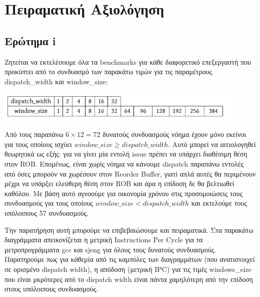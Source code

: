 \section{Πειραματική Αξιολόγηση}
\subsection{Ερώτημα i}
Ζητείται να εκτελέσουμε όλα τα benchmarks για κάθε διαφορετικό επεξεργαστή που
προκύπτει από το συνδυασμό των παρακάτω τιμών για τις παραμέτρους dispatch\_width
και window\_size:

\begin{center}
   \vspace{3mm}
   \includegraphics[width=0.9\textwidth]{./imgs/combos.png}
   \vspace{3mm}
\end{center}

\noindent Από τους παραπάνω $6 \times 12  = 72$ δυνατούς συνδυασμούς νόημα έχουν
μόνο εκείνοι για τους οποίους ισχύει $window\_size \geq dispatch\_width$. Αυτό
μπορεί να αιτιολογηθεί θεωρητικά ως εξής: για να γίνει μία εντολή issue πρέπει
να υπάρχει διαθέσιμη θέση στον ROB. Επομένως, είναι χωρίς νόημα να κάνουμε
dispatch παραπάνω εντολές από όσες μπορούν να χωρέσουν στον Reorder Buffer,
γιατί απλά αυτές θα περιμένουν μέχρι να υπάρξει ελεύθερη θέση στον ROB και άρα η
επίδοση δε θα βελτιωθεί καθόλου. Με βάση αυτό αγνοούμε για οικονομία χρόνου στις
προσομοιώσεις τους συνδυασμούς για τους οποίους $window\_size < dispatch\_width$
και εκτελούμε τους υπόλοιπους 57 συνδυασμούς. 

Την παρατήρηση αυτή μπορούμε να επιβεβαιώσουμε και πειραματικά. Στα παρακάτω
διαγράμματα απεικονίζεται η μετρική Instructions Per Cycle για τα
μετροπρογράμματα gcc και sjeng για όλους τους δυνατούς συνδυασμούς. Παρατηρούμε
πως για κάθεμία από τις καμπύλες των διαγραμμάτων (που ανατιστοιχεί σε ορισμένο
dispatch width), η απόδοση (μετρική IPC) για τις τιμές windows\_size που είναι
μκρότερες από το dispatch width είναι πάντα χαμηλότερη από την επίδοση στους
υπόλοιπους συνδυασμούς.

